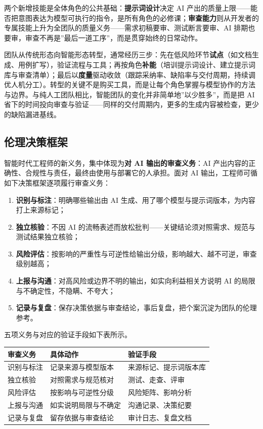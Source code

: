 \documentclass[12pt,a4paper,twoside,openany]{ctexbook}
\numberwithin{figure}{chapter}
\numberwithin{table}{chapter}
\providecommand{\tightlist}{\setlength{\itemsep}{0pt}\setlength{\parskip}{0pt}}
\newcounter{none}
\begin{document}
两个新增技能是全体角色的公共基础：\textbf{提示词设计}决定 AI
产出的质量上限------能否把意图表达为模型可执行的指令，是所有角色的必修课；\textbf{审查能力}则从开发者的专属技能上升为全团队的质量义务------需求初稿要审、测试断言要审、AI
排期也要审，审查不再是''最后一道工序''，而是贯穿始终的日常动作。

团队从传统形态向智能形态转型，通常经历三步：先在低风险环节\textbf{试点}（如文档生成、用例扩写），验证流程与工具；再按角色\textbf{补能}（培训提示词设计、建立提示词库与审查清单）；最后以\textbf{度量}驱动收敛（跟踪采纳率、缺陷率与交付周期，持续调优人机分工）。转型的关键不是购买工具，而是让每个角色掌握与模型协作的方法与边界。与纯人工团队相比，智能团队的变化并非简单地''以少胜多''，而是把
AI
省下的时间投向审查与验证------同样的交付周期内，更多的生成内容被检查，更少的缺陷漏进基线。

\subsection{伦理决策框架}\label{ux4f26ux7406ux51b3ux7b56ux6846ux67b6}

智能时代工程师的新义务，集中体现为\textbf{对 AI 输出的审查义务}：AI
产出内容的正确性、合规性与责任，最终由使用与部署它的人承担。面对 AI
输出，工程师可循如下决策框架逐项履行审查义务：

\begin{enumerate}
\def\labelenumi{\arabic{enumi}.}
\tightlist
\item
  \textbf{识别与标注}：明确哪些输出由 AI
  生成、用了哪个模型与提示词版本，为内容打上来源标记；
\item
  \textbf{独立核验}：不因 AI
  的流畅表述而放松批判------关键结论须对照需求、规范与测试结果独立核验；
\item
  \textbf{风险评估}：按影响的严重性与可逆性给输出分级，影响越大、越不可逆，审查级别越高；
\item
  \textbf{上报与沟通}：对高风险或边界不明的输出，如实向利益相关方说明 AI
  的局限与不确定性，不隐瞒、不夸大；
\item
  \textbf{记录与复盘}：保存决策依据与审查结论，事后复盘，把个案沉淀为团队的伦理参考。
\end{enumerate}

五项义务与对应的验证手段如下表所示。

{\def\LTcaptype{none} %
\begin{longtable}[]{@{}lll@{}}
\toprule\noalign{}
审查义务 & 具体动作 & 验证手段 \\
\midrule\noalign{}
\endhead
\bottomrule\noalign{}
\endlastfoot
识别与标注 & 记录来源与模型版本 & 来源标记、提示词版本库 \\
独立核验 & 对照需求与规范核对 & 测试、走查、评审 \\
风险评估 & 按影响与可逆性分级 & 风险矩阵、影响分析 \\
上报与沟通 & 如实说明局限与不确定 & 沟通记录、决策纪要 \\
记录与复盘 & 留存依据与审查结论 & 审计日志、复盘文档 \\
\end{longtable}
}
\end{document}
